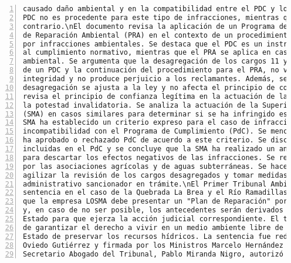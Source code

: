 \begin{Verbatim}[frame=lines, label=Elavoración propia -  Ejemplo de Contexto enviado por el Chatbot a OpenAI
				, fontsize=\footnotesize, numbers=left
				, baselinestretch=0.4
				, formatcom=\color{gray}]
causado daño ambiental y en la compatibilidad entre el PDC y los PRA. La SMA argumenta que el
PDC no es procedente para este tipo de infracciones, mientras que las reclamantes sostienen lo
contrario.\nEl documento revisa la aplicación de un Programa de Cumplimiento (PDC) y un Plan
de Reparación Ambiental (PRA) en el contexto de un procedimiento administrativo sancionatorio
por infracciones ambientales. Se destaca que el PDC es un instrumento voluntario de incentivo
al cumplimiento normativo, mientras que el PRA se aplica en casos de infracciones con daño
ambiental. Se argumenta que la desagregación de los cargos 11 y 12, que generó la aprobación
de un PDC y la continuación del procedimiento para el PRA, no vulnera el criterio de
integridad y no produce perjuicio a los reclamantes. Además, se señala que la decisión de
desagregación se ajusta a la ley y no afecta el principio de confianza legítima.\nEl artículo
revisa el principio de confianza legítima en la actuación de la administración como límite a
la potestad invalidatoria. Se analiza la actuación de la Superintendencia del Medio Ambiente
(SMA) en casos similares para determinar si se ha infringido este principio. Se destaca que la
SMA ha establecido un criterio expreso para el caso de infracciones con daño ambiental y su
incompatibilidad con el Programa de Cumplimiento (PdC). Se mencionan casos en los que la SMA
ha aprobado o rechazado PdC de acuerdo a este criterio. Se discute la eficacia de las medidas
incluidas en el PdC y se concluye que la SMA ha realizado un análisis razonable y motivado
para descartar los efectos negativos de las infracciones. Se rechaza la reclamación presentada
por las asociaciones agrícolas y de aguas subterráneas. Se hace un llamado a la SMA para
agilizar la revisión de los cargos desagregados y tomar medidas oportunas en el procedimiento
administrativo sancionador en trámite.\nEl Primer Tribunal Ambiental de Chile emitió una
sentencia en el caso de la Quebrada La Brea y el Río Ramadillas. En la sentencia, se establece
que la empresa LOSMA debe presentar un "Plan de Reparación" por los daños ambientales causados
y, en caso de no ser posible, los antecedentes serán derivados al Consejo de Defensa del
Estado para que ejerza la acción judicial correspondiente. El tribunal destaca la importancia
de garantizar el derecho a vivir en un medio ambiente libre de contaminación y el deber del
Estado de preservar los recursos hídricos. La sentencia fue redactada por el Ministro Mauricio
Oviedo Gutiérrez y firmada por los Ministros Marcelo Hernández Rojas y Juan Opazo Lagos. El
Secretario Abogado del Tribunal, Pablo Miranda Nigro, autorizó la notificación de la

\end{Verbatim}
